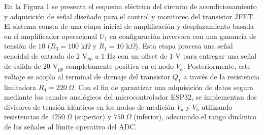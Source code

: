 \documentclass[conference]{IEEEtran}
\begin{document}
En la Figura 1 se presenta el esquema eléctrico del circuito de
acondicionamiento y adquisición de señal diseñado para el control y monitoreo
del transistor JFET\@. El sistema consta de una etapa inicial de amplificación
y desplazamiento basada en el amplificador operacional $U_1$ en configuración
inversora con una ganancia de tensión de $10$ ($R_3 = 100\text{ k}\Omega$ y
$R_1 = 10\text{ k}\Omega$). Esta etapa procesa una señal senoidal de entrada de
$2\text{ V}_{pp}$ a $1\text{ Hz}$ con un offset de $1\text{ V}$ para entregar
una señal de salida de $20\text{ V}_{pp}$ completamente positiva en el nodo
$V_a$. Posteriormente, este voltaje se acopla al terminal de drenaje del
transistor $Q_1$ a través de la resistencia limitadora $R_4 = 220\ \Omega$. Con
el fin de garantizar una adquisición de datos segura mediante los canales
analógicos del microcontrolador ESP32, se implementan dos divisores de tensión
idénticos en los nodos de medición $V_a$ y $V_b$ utilizando resistencias de
$4250\ \Omega$ (superior) y $750\ \Omega$ (inferior), adecuando el rango
dinámico de las señales al límite operativo del ADC\@.
\end{document}
